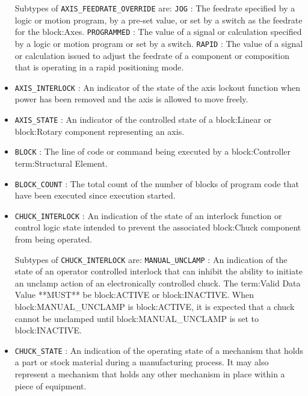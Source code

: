 \begin{itemize}
Subtypes of \texttt{AXIS_FEEDRATE_OVERRIDE} are: 
\newline\tab \texttt{JOG} : The feedrate specified by a logic or motion program, by a pre-set value, or set by a switch as the feedrate for the {block:Axes}.  
\newline\tab \texttt{PROGRAMMED} : The value of a signal or calculation specified by a logic or motion program or set by a switch. 
\newline\tab \texttt{RAPID} : The value of a signal or calculation issued to adjust the feedrate of a component or composition that is operating in a rapid positioning mode. 
\item \texttt{AXIS_INTERLOCK} : An indicator of the state of the axis lockout function when power has been removed and the axis is allowed to move freely. 

\item \texttt{AXIS_STATE} : An indicator of the controlled state of a {block:Linear} or {block:Rotary} component representing an axis. 

\item \texttt{BLOCK} : The line of code or command being executed by a {block:Controller} {term:Structural Element}. 

\item \texttt{BLOCK_COUNT} : The total count of the number of blocks of program code that have been executed since execution started. 

\item \texttt{CHUCK_INTERLOCK} : An indication of the state of an interlock function or control logic state intended to prevent the associated {block:Chuck} component from being operated. 

Subtypes of \texttt{CHUCK_INTERLOCK} are: 
\newline\tab \texttt{MANUAL_UNCLAMP} : An indication of the state of an operator controlled interlock that can inhibit the ability to initiate an unclamp action of an electronically controlled chuck.
 The {term:Valid Data Value} **MUST** be {block:ACTIVE} or {block:INACTIVE}. 
 When {block:MANUAL_UNCLAMP} is {block:ACTIVE}, it is expected that a chuck cannot be unclamped until {block:MANUAL_UNCLAMP} is set to {block:INACTIVE}.  
\item \texttt{CHUCK_STATE} : An indication of the operating state of a mechanism that holds a part or stock material during a manufacturing process. It may also represent a mechanism that holds any other mechanism in place within a piece of equipment. 


\end{itemize}
